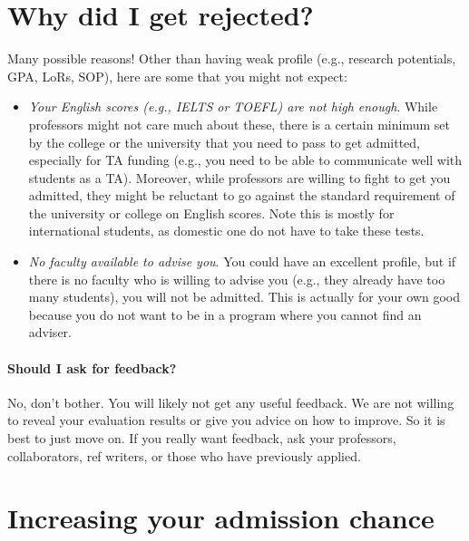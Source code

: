 \documentclass[oneside,11pt]{memoir}
\begin{document}
\section{Why did I get rejected?}
Many possible reasons!  Other than having weak profile (e.g., research potentials, GPA, LoRs, SOP), here are some that you might not expect:
\begin{itemize}
  \item  \emph{Your English scores (e.g., IELTS or TOEFL) are not high enough}.  While professors might not care much about these, there is a certain minimum set by the college or the university that you need to pass to get admitted, especially for TA funding (e.g., you need to be able to communicate well with students as a TA).  Moreover, while professors are willing to fight to get you admitted, they might be reluctant to go against the standard requirement of the university or college on English scores.  Note this is mostly for international students, as domestic one do not have to take these tests.

  \item \emph{No faculty available to advise you}.  You could have an excellent profile, but if there is no faculty who is willing to advise you (e.g., they already have too many students), you will not be admitted. This is actually for your own good because you do not want to be in a program where you cannot find an adviser.
\end{itemize}

\paragraph{Should I ask for feedback?}
No, don't bother.  You will likely not get any useful feedback.  We are not willing to reveal your evaluation results or give you advice on how to improve. So it is best to just move on.  If you really want feedback, ask your professors, collaborators, ref writers, or those who have previously applied.

\section{Increasing your admission chance}\label{sec:improve-your-chance}
\end{document}
